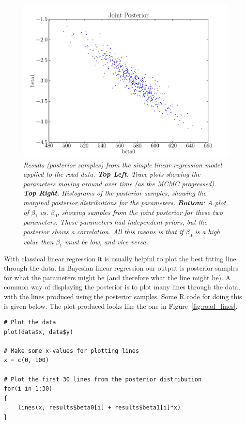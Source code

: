 \begin{figure}[ht!]
\begin{center}
\includegraphics[scale=0.35]{Figures/road_joint.pdf}
\caption{\it Results (posterior samples) from the simple linear regression model
applied to the road data.
{\bf Top Left}: Trace plots showing the parameters moving around over time (as the
MCMC progressed). 
{\bf Top Right}: Histograms of the posterior samples, showing the marginal
posterior distributions for the parameters.
{\bf Bottom}: A plot of $\beta_1$ vs. $\beta_0$, showing samples from the joint
posterior for these two parameters. These parameters had independent priors, but
the posterior shows a correlation. All this means is that if $\beta_0$ is a
high value then $\beta_1$ must be low, and vice versa.
\label{fig:road_results}}
\end{center}
\end{figure}

With classical linear regression it is usually helpful to plot the best fitting
line through the data. In Bayesian linear regression our output is posterior
samples for what the parameters might be (and therefore what the line might be).
A common way of displaying the posterior is to plot many lines through the data,
with the lines produced using the posterior samples. Some R code for doing this
is given below. The plot produced looks like the one in
Figure~\ref{fig:road_lines}.

\begin{framed}
\begin{verbatim}
# Plot the data
plot(data$x, data$y)

# Make some x-values for plotting lines
x = c(0, 100)

# Plot the first 30 lines from the posterior distribution
for(i in 1:30)
{
    lines(x, results$beta0[i] + results$beta1[i]*x)
}
\end{verbatim}
\end{framed}


